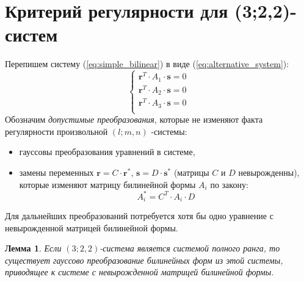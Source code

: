 \documentclass[10pt]{article}
\newtheorem{lemma}{Лемма}
\begin{document}
\section{Критерий регулярности для (3;2,2)-систем}
Перепишем систему (\ref{eq:simple_bilinear}) в виде (\ref{eq:alternative_system}): 
\begin{equation}\label{eq:simple_forms}
	\begin{cases}
		\mathbf{r}^T \cdot A_1 \cdot \mathbf{s} = 0 \\ 
		\mathbf{r}^T \cdot A_2 \cdot \mathbf{s} = 0 \\ 
		\mathbf{r}^T \cdot A_3 \cdot \mathbf{s} = 0 \\ 
	\end{cases}
\end{equation}
Обозначим \textit{допустимые преобразования}, которые не изменяют факта регулярности
произвольной $(l; m, n)$ -системы: 
\begin{itemize}
 	\item гауссовы преобразования уравнений в системе, 
	
	\item замены переменных $\mathbf{r} = C \cdot \mathbf{r}^*$, $\mathbf{s} = D \cdot 
	\mathbf{s}^*$ (матрицы $C$ и $D$ невырожденны), которые изменяют матрицу билинейной 
	формы $A_i$ по закону:
	$$
		A^{*}_{i} = C^T \cdot A_i \cdot D
	$$
\end{itemize}
Для дальнейших преобразований потребуется хотя бы одно уравнение с невырожденной матрицей 
билинейной формы. 
\begin{lemma}
	Если $(3;2,2)$-система является системой полного ранга, то существует гауссово 
	преобразование билинейных форм из этой системы, приводящее к системе с невырожденной 
	матрицей билинейной формы.
\end{lemma}
\end{document}
